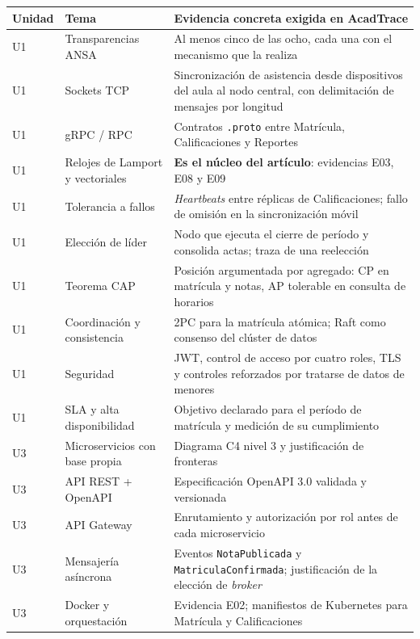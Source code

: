 \documentclass[11pt,a4paper]{article}
\begin{document}
\begin{center}
	\footnotesize
	\begin{longtable}{@{}p{1.2cm}p{5.2cm}p{8.4cm}@{}}
		\toprule
		\textbf{Unidad} & \textbf{Tema} & \textbf{Evidencia concreta exigida en AcadTrace} \\
		\midrule
		\endhead
		U1 & Transparencias ANSA & Al menos cinco de las ocho, cada una con el mecanismo que la realiza \\
		U1 & Sockets TCP & Sincronización de asistencia desde dispositivos del aula al nodo central, con delimitación de mensajes por longitud \\
		U1 & gRPC / RPC & Contratos \texttt{.proto} entre Matrícula, Calificaciones y Reportes \\
		U1 & Relojes de Lamport y vectoriales & \textbf{Es el núcleo del artículo}: evidencias E03, E08 y E09 \cite{lamport1978time} \\
		U1 & Tolerancia a fallos & \emph{Heartbeats} entre réplicas de Calificaciones; fallo de omisión en la sincronización móvil \\
		U1 & Elección de líder & Nodo que ejecuta el cierre de período y consolida actas; traza de una reelección \\
		U1 & Teorema CAP & Posición argumentada por agregado: CP en matrícula y notas, AP tolerable en consulta de horarios \cite{gilbert2002brewer} \\
		U1 & Coordinación y consistencia & 2PC para la matrícula atómica; Raft como consenso del clúster de datos \\
		U1 & Seguridad & JWT, control de acceso por cuatro roles, TLS y controles reforzados por tratarse de datos de menores \\
		U1 & SLA y alta disponibilidad & Objetivo declarado para el período de matrícula y medición de su cumplimiento \\
		\addlinespace
		U3 & Microservicios con base propia & Diagrama C4 nivel 3 y justificación de fronteras \\
		U3 & API REST + OpenAPI & Especificación OpenAPI 3.0 validada y versionada \\
		U3 & API Gateway & Enrutamiento y autorización por rol antes de cada microservicio \\
		U3 & Mensajería asíncrona & Eventos \texttt{NotaPublicada} y \texttt{MatriculaConfirmada}; justificación de la elección de \emph{broker} \\
		U3 & Docker y orquestación & Evidencia E02; manifiestos de Kubernetes para Matrícula y Calificaciones \\

\end{longtable}
\end{center}
\end{document}
